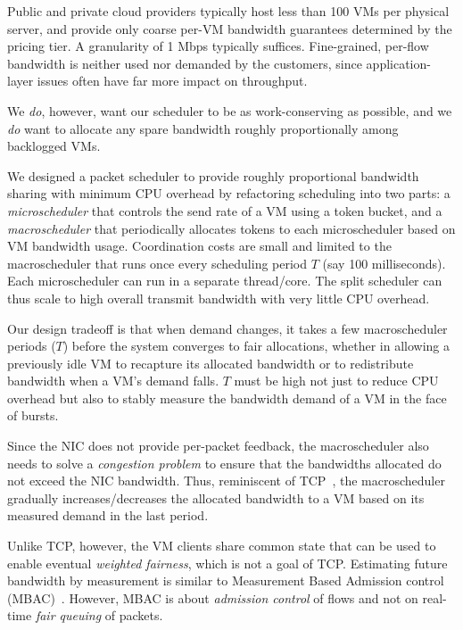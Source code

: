  Public and private cloud providers typically host 
less than 100 VMs per physical server, and provide only coarse per-VM bandwidth guarantees
determined by the pricing tier.  A granularity of 1 Mbps typically suffices.  Fine-grained, per-flow bandwidth is neither
used nor demanded by the customers, since application-layer issues often have
far more impact on throughput.

We {\em do}, however, want our scheduler to be as work-conserving as possible,
and we {\em do} want to allocate any spare bandwidth roughly proportionally
among backlogged VMs.

We designed a packet scheduler to provide roughly proportional bandwidth sharing
with  minimum CPU overhead by refactoring scheduling into two parts: a {\em
microscheduler} that controls the send rate of a VM using a token bucket, and a
{\em macroscheduler} that periodically allocates tokens to each microscheduler
based on VM bandwidth usage.  Coordination costs are small and limited to the
macroscheduler that runs once every scheduling period $T$ (say 100
milliseconds). Each microscheduler can run in a separate thread/core. The split
scheduler can thus scale to high overall transmit bandwidth with very little
CPU overhead.

Our design tradeoff is that when demand changes, it takes a few macroscheduler
periods ($T$) before the system converges to fair allocations, whether in
allowing a previously idle VM to recapture its allocated bandwidth or to
redistribute bandwidth when a VM's demand falls.  $T$  must be high not just to
reduce CPU overhead but also to stably measure the bandwidth demand of a VM in
the face of bursts.

Since the NIC does not provide per-packet feedback, the macroscheduler also
needs to solve a {\em congestion problem} to ensure that the bandwidths
allocated do not exceed the NIC bandwidth.  Thus, reminiscent of TCP~\cite{tcp},
the macroscheduler gradually increases/decreases the allocated bandwidth to a VM
based on its measured demand in the last period.  

Unlike TCP, however, the VM clients share common state that can be used to
enable eventual {\em weighted fairness}, which is not a goal of TCP.  Estimating
future bandwidth by measurement is similar to  Measurement Based Admission
control (MBAC)~\cite{mbac}.  However, MBAC is about {\em admission control} of
flows  and not on real-time {\em fair queuing} of packets. 

